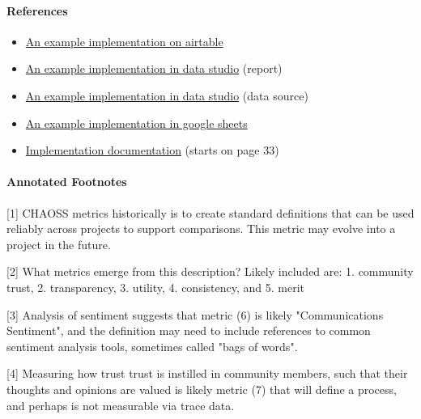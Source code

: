 \hypertarget{references}{%
\paragraph{References}\label{references}}

\begin{itemize}
\tightlist
\item
  \href{https://airtable.com/invite/l?inviteId=inv8u49VVMtQTrfFU\&inviteToken=c49b1ed3759c5cd736901fd81c9f460f86e8e9f462703c4f85a3bdd7250ca5a7}{An
  example implementation on airtable}
\item
  \href{https://datastudio.google.com/open/1X9UdQz8FtHHmjMBpjba3pFqE55lNpwg5}{An
  example implementation in data studio} (report)
\item
  \href{https://datastudio.google.com/open/1Z4EJ03898lZxm2NZVULaEoLS0bYqL79A}{An
  example implementation in data studio} (data source)
\item
  \href{https://drive.google.com/open?id=1zi3JE0bwfEdRdc-wQEZn8GaB7sE8IvxeSeqvVywKnXw}{An
  example implementation in google sheets}
\item
  \href{https://docs.google.com/document/d/1RlAedRBQbhq0oYMCB3VqdawOCZE2XT5R3teydjBZODM/edit\#heading=h.8hyunaadfriq}{Implementation
  documentation} (starts on page 33)
\end{itemize}

\hypertarget{annotated-footnotes}{%
\paragraph{Annotated Footnotes}\label{annotated-footnotes}}

{[}1{]} CHAOSS metrics historically is to create standard definitions
that can be used reliably across projects to support comparisons. This
metric may evolve into a project in the future.

{[}2{]} What metrics emerge from this description? Likely included are:
1. community trust, 2. transparency, 3. utility, 4. consistency, and 5.
merit

{[}3{]} Analysis of sentiment suggests that metric (6) is likely
"Communications Sentiment", and the definition may need to include
references to common sentiment analysis tools, sometimes called "bags of
words".

{[}4{]} Measuring how trust trust is instilled in community members,
such that their thoughts and opinions are valued is likely metric (7)
that will define a process, and perhaps is not measurable via trace
data.

